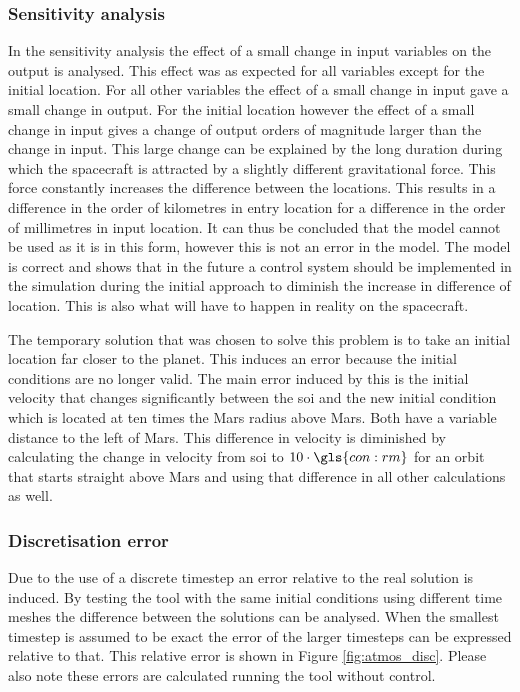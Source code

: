 \subsubsection{Sensitivity analysis}
\label{sec:astrosens}

In the sensitivity analysis the effect of a small change in input variables on the output is analysed. This effect was as expected for all variables except for the initial location. For all other variables the effect of a small change in input gave a small change in output. For the initial location however the effect of a small change in input gives a change of output orders of magnitude larger than the change in input. This large change can be explained by the long duration during which the spacecraft is attracted by a slightly different gravitational force. This force constantly increases the difference between the locations. This results in a difference in the order of kilometres in entry location for a difference in the order of millimetres in input location. It can thus be concluded that the model cannot be used as it is in this form, however this is not an error in the model. The model is correct and shows that in the future a control system should be implemented in the simulation during the initial approach to diminish the increase in difference of location. This is also what will have to happen in reality on the spacecraft.

The temporary solution that was chosen to solve this problem is to take an initial location far closer to the planet. This induces an error because the initial conditions are no longer valid. The main error induced by this is the initial velocity that changes significantly between the \gls{soi} and the new initial condition which is located at ten times the Mars radius above Mars. Both have a variable distance to the left of Mars. This difference in velocity is diminished by calculating the change in velocity from \gls{soi} to $10\cdot\gls{con:rm}$ for an orbit that starts straight above Mars and using that difference in all other calculations as well.

\subsubsection{Discretisation error}
\label{sec:astrodisc}

Due to the use of a discrete timestep an error relative to the real solution is induced. By testing the tool with the same initial conditions using different time meshes the difference between the solutions can be analysed. When the smallest timestep is assumed to be exact the error of the larger timesteps can be expressed relative to that. This relative error is shown in Figure \ref{fig:atmos_disc}. Please also note these errors are calculated running the tool without control.

